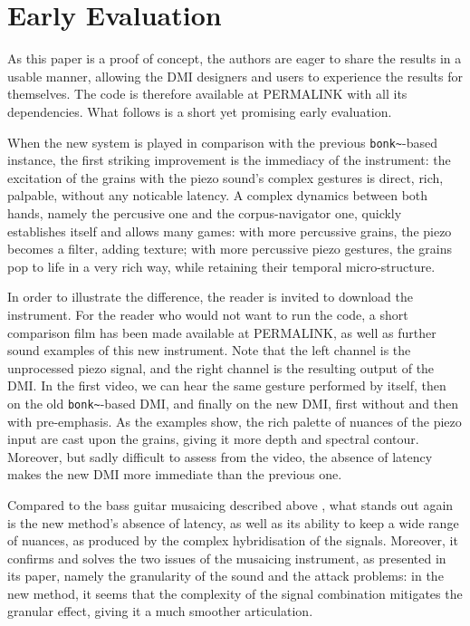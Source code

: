 \section{Early Evaluation}\label{sec:eval}

As this paper is a proof of concept, the authors are eager to share the results in a usable manner, allowing the DMI designers and users to experience the results for themselves. The code is therefore available at PERMALINK with all its dependencies. What follows is a short yet promising early evaluation.

When the new system is played in comparison with the previous \verb|bonk~|-based instance, the first striking improvement is the immediacy of the instrument: the excitation of the grains with the piezo sound's complex gestures is direct, rich, palpable, without any noticable latency. A complex dynamics between both hands, namely the percusive one and the corpus-navigator one, quickly establishes itself and allows many games: with more percussive grains, the piezo becomes a filter, adding texture; with more percussive piezo gestures, the grains pop to life in a very rich way, while retaining their temporal micro-structure.

In order to illustrate the difference, the reader is invited to download the instrument. For the reader who would not want to run the code, a short comparison film has been made available at PERMALINK, as well as further sound examples of this new instrument. Note that the left channel is the unprocessed piezo signal, and the right channel is the resulting output of the DMI. In the first video, we can hear the same gesture performed by itself, then on the old \verb|bonk~|-based DMI, and finally on the new DMI, first without and then with pre-emphasis. As the examples show, the rich palette of nuances of the piezo input are cast upon the grains, giving it more depth and spectral contour. Moreover, but sadly difficult to assess from the video, the absence of latency makes the new DMI more immediate than the previous one.

Compared to the bass guitar musaicing described above \cite{TremblaySchwarz-nime2010-surfing-the-waves}, what stands out again is the new method's absence of latency, as well as its ability to keep a wide range of nuances, as produced by the complex hybridisation of the signals. Moreover, it confirms and solves the two issues of the musaicing instrument, as presented in its paper, namely the granularity of the sound and the attack problems: in the new method, it seems that the complexity of the signal combination mitigates the granular effect, giving it a much smoother articulation.
